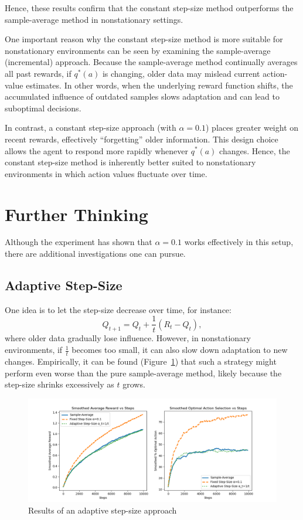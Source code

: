 \documentclass{article}
\begin{document}
Hence, these results confirm that the constant step-size method outperforms the sample-average method in nonstationary settings.

One important reason why the constant step-size method is more suitable for nonstationary environments can be seen by examining the sample-average (incremental) approach. Because the sample-average method continually averages all past rewards, if \(q^*(a)\) is changing, older data may mislead current action-value estimates. In other words, when the underlying reward function shifts, the accumulated influence of outdated samples slows adaptation and can lead to suboptimal decisions.

In contrast, a constant step-size approach (with \(\alpha=0.1\)) places greater weight on recent rewards, effectively ``forgetting'' older information. This design choice allows the agent to respond more rapidly whenever \(q^*(a)\) changes. Hence, the constant step-size method is inherently better suited to nonstationary environments in which action values fluctuate over time.





\section{Further Thinking}

Although the experiment has shown that \(\alpha=0.1\) works effectively in this setup, there are additional investigations one can pursue.

\subsection{Adaptive Step-Size}

One idea is to let the step-size decrease over time, for instance:
\[
Q_{t+1} = Q_t + \frac{1}{t}(R_t - Q_t),
\]
where older data gradually lose influence. However, in nonstationary environments, if \(\frac{1}{t}\) becomes too small, it can also slow down adaptation to new changes. Empirically, it can be found (Figure~\ref{fig:4.1}) that such a strategy might perform even worse than the pure sample-average method, likely because the step-size shrinks excessively as \(t\) grows.


\begin{figure}[h!]
\centering
\includegraphics[width=\linewidth]{figure4.png}
\caption{Results of an adaptive step-size approach}
\label{fig:4.1}
\end{figure}
\end{document}
